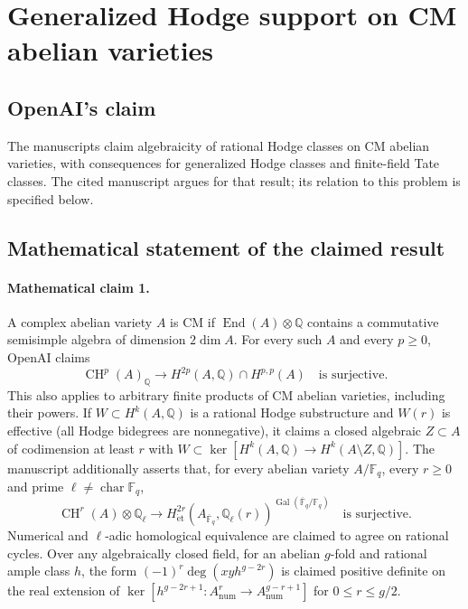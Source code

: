 \documentclass[11pt]{article}
\begin{document}
\section*{Generalized Hodge support on CM abelian varieties}

\subsection{OpenAI's claim}
The manuscripts claim algebraicity of rational Hodge classes on CM abelian varieties, with consequences for generalized Hodge classes and finite-field Tate classes. The cited manuscript argues for that result; its relation to this problem is specified below.

\subsection{Mathematical statement of the claimed result}
\paragraph{Mathematical claim 1.} A complex abelian variety $A$ is CM if $\operatorname{End}(A)\otimes\mathbb Q$ contains a commutative semisimple algebra of dimension $2\dim A$. For every such $A$ and every $p\ge0$, OpenAI claims
\[
\operatorname{CH}^p(A)_{\mathbb Q}\longrightarrow H^{2p}(A,\mathbb Q)\cap H^{p,p}(A)
\quad\text{is surjective}.
\]
This also applies to arbitrary finite products of CM abelian varieties, including their powers. If $W\subset H^k(A,\mathbb Q)$ is a rational Hodge substructure and $W(r)$ is effective (all Hodge bidegrees are nonnegative), it claims a closed algebraic $Z\subset A$ of codimension at least $r$ with $W\subset\ker[H^k(A,\mathbb Q)\to H^k(A\setminus Z,\mathbb Q)]$.
The manuscript additionally asserts that, for every abelian variety $A/\mathbb F_q$, every $r\ge0$ and prime $\ell\ne\operatorname{char}\mathbb F_q$,
\[
\operatorname{CH}^r(A)\otimes\mathbb Q_\ell\longrightarrow
H^{2r}_{\mathrm{\acute et}}(A_{\overline{\mathbb F}_q},\mathbb Q_\ell(r))^{\operatorname{Gal}(\overline{\mathbb F}_q/\mathbb F_q)}
\quad\text{is surjective}.
\]
Numerical and $\ell$-adic homological equivalence are claimed to agree on rational cycles. Over any algebraically closed field, for an abelian $g$-fold and rational ample class $h$, the form $(-1)^r\deg(xyh^{g-2r})$ is claimed positive definite on the real extension of $\ker[h^{g-2r+1}:A^r_{\mathrm{num}}\to A^{g-r+1}_{\mathrm{num}}]$ for $0\le r\le g/2$.
\end{document}
